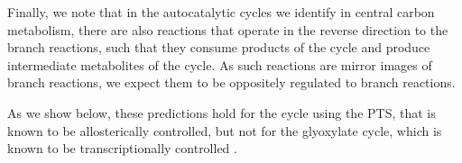     Finally, we note that in the autocatalytic cycles we identify in central carbon metabolism, there are also reactions that operate in the reverse direction to the branch reactions, such that they consume products of the cycle and produce intermediate metabolites of the cycle.
    As such reactions are mirror images of branch reactions, we expect them to be oppositely regulated to branch reactions.

    As we show below, these predictions hold for the cycle using the PTS, that is known to be allosterically controlled, but not for the glyoxylate cycle, which is known to be transcriptionally controlled \cite{Gerosa2015-oq}.
